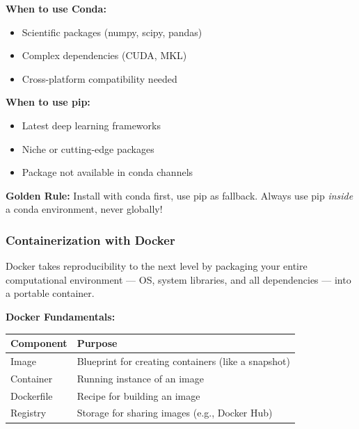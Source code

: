 \documentclass[11pt,a4paper]{article}
\begin{document}
\begin{tcolorbox}[colback=yellow!5,colframe=orange!60,title={Pro Tip: Conda vs pip}]
\textbf{When to use Conda:}
\begin{itemize}
    \item Scientific packages (numpy, scipy, pandas)
    \item Complex dependencies (CUDA, MKL)
    \item Cross-platform compatibility needed
\end{itemize}

\textbf{When to use pip:}
\begin{itemize}
    \item Latest deep learning frameworks
    \item Niche or cutting-edge packages
    \item Package not available in conda channels
\end{itemize}

\textbf{Golden Rule:} Install with conda first, use pip as fallback. Always use pip \textit{inside} a conda environment, never globally!
\end{tcolorbox}

\subsubsection{Containerization with Docker}

Docker takes reproducibility to the next level by packaging your entire computational environment — OS, system libraries, and all dependencies — into a portable container.

\textbf{Docker Fundamentals:}

\begin{tcolorbox}[colback=purple!5,colframe=purple!40,title={Docker Architecture}]
\begin{center}
\begin{tabular}{ll}
\textbf{Component} & \textbf{Purpose} \\
\midrule
Image & Blueprint for creating containers (like a snapshot) \\
Container & Running instance of an image \\
Dockerfile & Recipe for building an image \\
Registry & Storage for sharing images (e.g., Docker Hub) \\
\end{tabular}
\end{center}
\end{tcolorbox}
\end{document}

